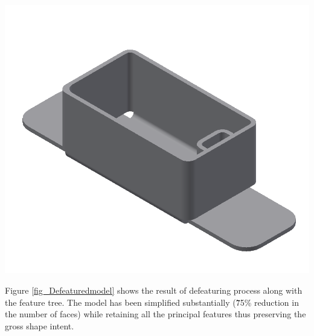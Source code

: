 

\begin{minipage}{\linewidth}
\begin{minipage}[c]{0.62\linewidth}
\includegraphics[width=\linewidth,valign=t]{../Common/images/SheetMetal_Medium_Enclosure_DefeaturedPart}

 \label{fig_Defeaturedmodel}

\bigskip

Figure \ref{fig_Defeaturedmodel} shows the result of defeaturing process along with the feature tree. The model has been simplified substantially (\~75\% reduction in the number of faces) while retaining all the principal features thus preserving the gross shape intent.


\end{minipage}
\end{minipage}
